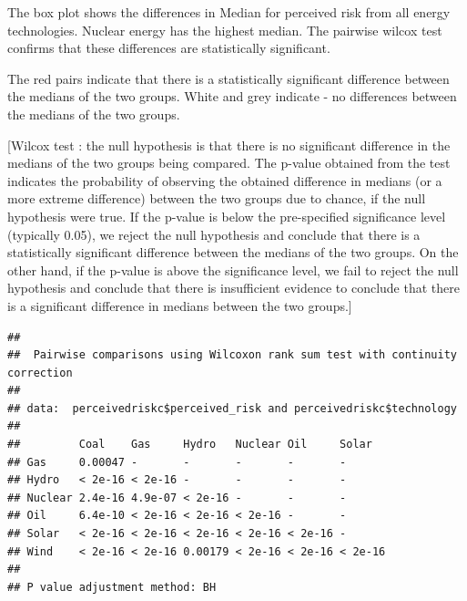 \documentclass[
]{article}
\begin{document}
The box plot shows the differences in Median for perceived risk from all
energy technologies. Nuclear energy has the highest median. The pairwise
wilcox test confirms that these differences are statistically
significant.

The red pairs indicate that there is a statistically significant
difference between the medians of the two groups. White and grey
indicate - no differences between the medians of the two groups.

{[}Wilcox test : the null hypothesis is that there is no significant
difference in the medians of the two groups being compared. The p-value
obtained from the test indicates the probability of observing the
obtained difference in medians (or a more extreme difference) between
the two groups due to chance, if the null hypothesis were true. If the
p-value is below the pre-specified significance level (typically 0.05),
we reject the null hypothesis and conclude that there is a statistically
significant difference between the medians of the two groups. On the
other hand, if the p-value is above the significance level, we fail to
reject the null hypothesis and conclude that there is insufficient
evidence to conclude that there is a significant difference in medians
between the two groups.{]}

\begin{verbatim}
## 
##  Pairwise comparisons using Wilcoxon rank sum test with continuity correction 
## 
## data:  perceivedriskc$perceived_risk and perceivedriskc$technology 
## 
##         Coal    Gas     Hydro   Nuclear Oil     Solar  
## Gas     0.00047 -       -       -       -       -      
## Hydro   < 2e-16 < 2e-16 -       -       -       -      
## Nuclear 2.4e-16 4.9e-07 < 2e-16 -       -       -      
## Oil     6.4e-10 < 2e-16 < 2e-16 < 2e-16 -       -      
## Solar   < 2e-16 < 2e-16 < 2e-16 < 2e-16 < 2e-16 -      
## Wind    < 2e-16 < 2e-16 0.00179 < 2e-16 < 2e-16 < 2e-16
## 
## P value adjustment method: BH
\end{verbatim}
\end{document}
